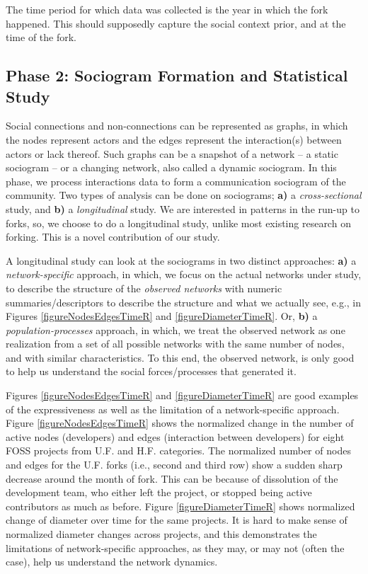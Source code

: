\documentclass[11pt]{report}
\begin{document}
The time period for which data was collected is the year in which the fork happened. This should supposedly capture the social context prior, and at the time of the fork.

\subsection{Phase 2: Sociogram Formation and Statistical Study}

Social connections and non-connections can be represented as graphs, in which the nodes represent actors and the edges represent the interaction(s) between actors or lack thereof. Such graphs can be a snapshot of a network -- a static sociogram -- or a changing network, also called a dynamic sociogram. In this phase, we process interactions data to form a communication sociogram of the community. Two types of analysis can be done on sociograms; \textbf{a)} a \textit{cross-sectional} study, and \textbf{b)} a \textit{longitudinal} study. We are interested in patterns in the run-up to forks, so, we choose to do a longitudinal study, unlike most existing research on forking. This is a novel contribution of our study.

A longitudinal study can look at the sociograms in two distinct approaches: \textbf{a)} a \textit{network-specific} approach, in which, we focus on the actual networks under study, to describe the structure of the \textit{observed networks} with numeric summaries/descriptors to describe the structure and what we actually see, e.g., in Figures \ref{figureNodesEdgesTimeR} and \ref{figureDiameterTimeR}. Or, \textbf{b)} a \textit{population-processes} approach, in which, we treat the observed network as one realization from a set of all possible networks with the same number of nodes, and with similar characteristics. To this end, the observed network, is only good to help us understand the social forces/processes that generated it.

Figures \ref{figureNodesEdgesTimeR} and \ref{figureDiameterTimeR} are good examples of the expressiveness as well as the limitation of a network-specific approach. Figure \ref{figureNodesEdgesTimeR} shows the normalized change in the number of active nodes (developers) and edges (interaction between developers) for eight FOSS projects from U.F. and H.F. categories. The normalized number of nodes and edges for the U.F. forks (i.e., second and third row) show a sudden sharp decrease around the month of fork. This can be because of dissolution of the development team, who either left the project, or stopped being active contributors as much as before. Figure  \ref{figureDiameterTimeR} shows normalized change of diameter over time for the same projects. It is hard to make sense of normalized diameter changes across projects, and this demonstrates the limitations of network-specific approaches, as they may, or may not (often the case), help us understand the network dynamics.
\end{document}
